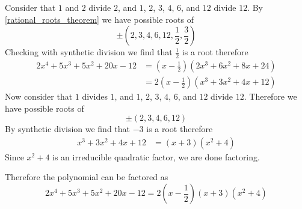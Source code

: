\documentclass[notes]{subfiles}
\begin{document}
\begin{solution}
    Consider that $1$ and $2$ divide $2$, and $1$, $2$, $3$, $4$, $6$, and $12$ divide $12$. By \cref{rational_roots_theorem} we have possible roots of
    \[
        \pm \left( 2, 3, 4, 6, 12, \frac{1}{2}, \frac{3}{2} \right)
    \]
    Checking with synthetic division we find that $\frac{1}{2}$ is a root therefore
    \begin{align*}
        2x^4 + 5x^3 + 5x^2 + 20x - 12
        &= \left( x - \frac{1}{2} \right)(2x^3 + 6x^2 + 8x + 24) \\
        &= 2\left( x - \frac{1}{2} \right)(x^3 + 3x^2 + 4x + 12)
    \end{align*}
    Now consider that $1$ divides $1$, and $1$, $2$, $3$, $4$, $6$, and $12$ divide $12$. Therefore we have possible roots of
    \[
        \pm \left( 2, 3, 4, 6, 12 \right)
    \]
    By synthetic division we find that $-3$ is a root therefore
    \begin{align*}
        x^3 + 3x^2 + 4x + 12
        &= (x + 3)(x^2 + 4)
    \end{align*}
    Since $x^2 + 4$ is an irreducible quadratic factor, we are done factoring.
    
    Therefore the polynomial can be factored as
    \[
        2x^4 + 5x^3 + 5x^2 + 20x - 12 = 2\left( x - \frac{1}{2} \right)(x + 3)(x^2 + 4)
    \]
\end{solution}
\end{document}
